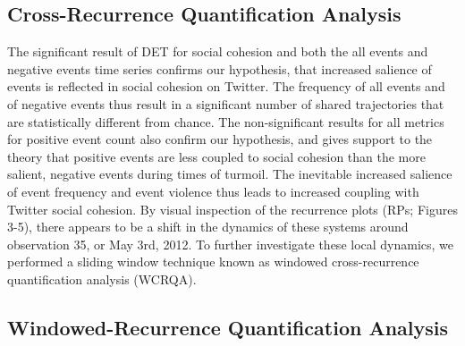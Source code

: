 \documentclass[english,man]{apa6}
\begin{document}
\hypertarget{cross-recurrence-quantification-analysis-2}{%
\subsection{Cross-Recurrence Quantification Analysis}\label{cross-recurrence-quantification-analysis-2}}

The significant result of DET for social cohesion and both the all events and negative events time series confirms our hypothesis, that increased salience of events is reflected in social cohesion on Twitter. The frequency of all events and of negative events thus result in a significant number of shared trajectories that are statistically different from chance. The non-significant results for all metrics for positive event count also confirm our hypothesis, and gives support to the theory that positive events are less coupled to social cohesion than the more salient, negative events during times of turmoil. The inevitable increased salience of event frequency and event violence thus leads to increased coupling with Twitter social cohesion.
By visual inspection of the recurrence plots (RPs; Figures 3-5), there appears to be a shift in the dynamics of these systems around observation 35, or May 3rd, 2012. To further investigate these local dynamics, we performed a sliding window technique known as windowed cross-recurrence quantification analysis (WCRQA).

\hypertarget{windowed-recurrence-quantification-analysis}{%
\subsection{Windowed-Recurrence Quantification Analysis}\label{windowed-recurrence-quantification-analysis}}
\end{document}
